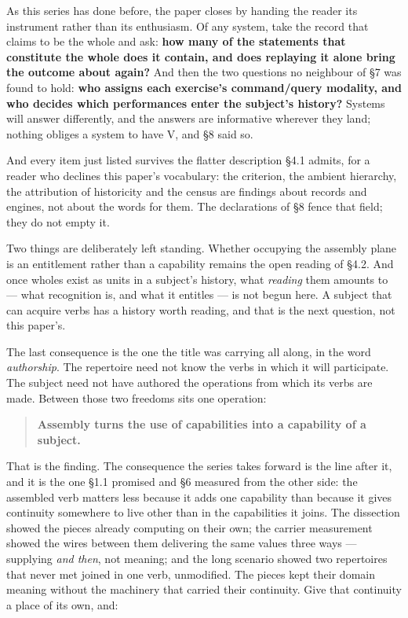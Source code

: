\documentclass[
]{article}
\begin{document}
As this series has done before, the paper closes by handing the reader
its instrument rather than its enthusiasm. Of any system, take the
record that claims to be the whole and ask: \textbf{how many of the
statements that constitute the whole does it contain, and does replaying
it alone bring the outcome about again?} And then the two questions no
neighbour of §7 was found to hold: \textbf{who assigns each exercise's
command/query modality, and who decides which performances enter the
subject's history?} Systems will answer differently, and the answers are
informative wherever they land; nothing obliges a system to have V, and
§8 said so.

And every item just listed survives the flatter description §4.1 admits,
for a reader who declines this paper's vocabulary: the criterion, the
ambient hierarchy, the attribution of historicity and the census are
findings about records and engines, not about the words for them. The
declarations of §8 fence that field; they do not empty it.

Two things are deliberately left standing. Whether occupying the
assembly plane is an entitlement rather than a capability remains the
open reading of §4.2. And once wholes exist as units in a subject's
history, what \emph{reading} them amounts to --- what recognition is,
and what it entitles --- is not begun here. A subject that can acquire
verbs has a history worth reading, and that is the next question, not
this paper's.

The last consequence is the one the title was carrying all along, in the
word \emph{authorship}. The repertoire need not know the verbs in which
it will participate. The subject need not have authored the operations
from which its verbs are made. Between those two freedoms sits one
operation:

\begin{quote}
\textbf{Assembly turns the use of capabilities into a capability of a
subject.}
\end{quote}

That is the finding. The consequence the series takes forward is the
line after it, and it is the one §1.1 promised and §6 measured from the
other side: the assembled verb matters less because it adds one
capability than because it gives continuity somewhere to live other than
in the capabilities it joins. The dissection showed the pieces already
computing on their own; the carrier measurement showed the wires between
them delivering the same values three ways --- supplying \emph{and
then}, not meaning; and the long scenario showed two repertoires that
never met joined in one verb, unmodified. The pieces kept their domain
meaning without the machinery that carried their continuity. Give that
continuity a place of its own, and:
\end{document}
